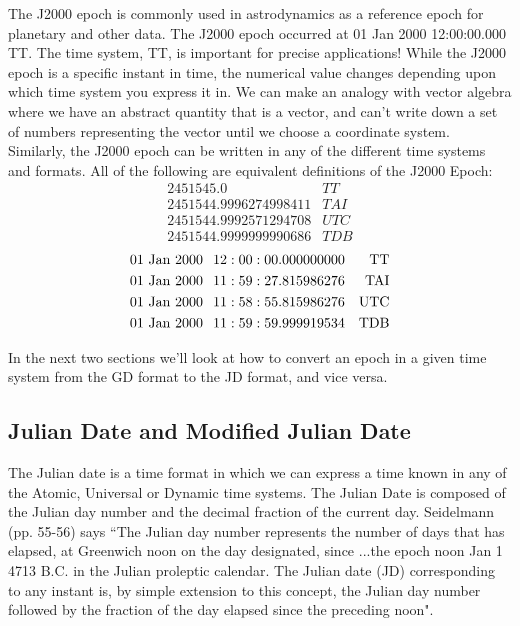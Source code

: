 The J2000 epoch  is commonly used in
astrodynamics as a reference epoch for planetary and other data. The
J2000 epoch occurred at 01 Jan 2000 12:00:00.000 TT.  The time
system, TT, is important for precise applications!  While the J2000
epoch is a specific instant in time, the numerical value changes
depending upon which time system you express it in. We can make an
analogy with vector algebra where we have an abstract quantity that
is a vector, and can't write down a set of numbers representing the
vector until we choose a coordinate system. Similarly, the J2000
epoch can be written in any of the different time systems and
formats. All of the following are equivalent definitions of the
J2000 Epoch:
%
\begin{eqnarray}
    2451545.0 & TT \nonumber \\
    2451544.9996274998411 & TAI \nonumber \\
    2451544.9992571294708 & UTC \nonumber\\
    2451544.9999999990686 & TDB \nonumber
\end{eqnarray}
%
\begin{eqnarray}
 & \mbox{01 Jan }   2000 \hspace{.1 in} 12:00:00.000000000 &\mbox{TT} \nonumber \\
& \mbox{01 Jan }  2000 \hspace{.1 in}   11:59:27.815986276  &\mbox{TAI} \nonumber \\
& \mbox{01 Jan }  2000 \hspace{.1 in} 11:58:55.815986276 &\mbox{UTC} \nonumber\\
 & \mbox{01 Jan }  2000 \hspace{.1 in} 11:59:59.999919534  &\mbox{TDB} \nonumber
\end{eqnarray}

In the next two sections we'll look at how to convert an epoch in a
given time system from the GD format to the JD format, and vice
versa.

\subsection{Julian Date and Modified Julian Date} \label{Sec:JDFormat}

The Julian date is a time format in which we can express a time
known in any of the Atomic, Universal or Dynamic time systems. The
Julian Date is composed of the Julian day number and the decimal
fraction of the current day.  Seidelmann\cite{seidelmann} (pp.
55-56) says ``The Julian day number represents the number of days
that has elapsed, at Greenwich noon on the day designated, since
...the epoch noon Jan 1 4713 B.C. in the Julian proleptic
calendar.  The Julian date (JD) corresponding to any instant is,
by simple extension to this concept, the Julian day number
followed by  the fraction of the day elapsed since the preceding
noon".

